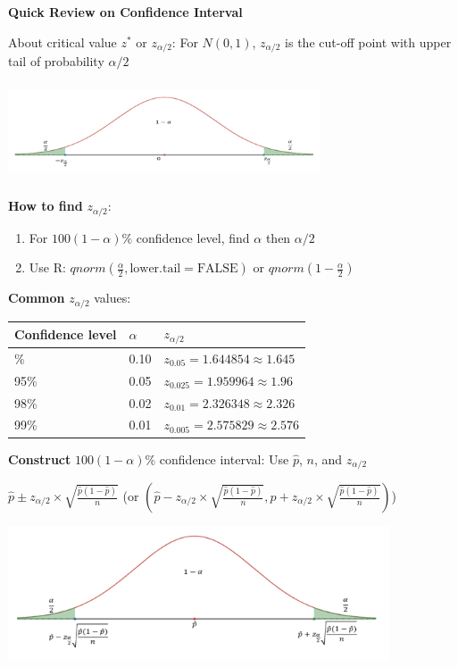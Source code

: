\documentclass[
]{book}
\begin{document}
\textbf{Quick Review on Confidence Interval}

About critical value \(z^*\) or \(z_{\alpha/2}\): For \(N(0,1)\), \(z_{\alpha/2}\) is the cut-off point with upper tail of probability \(\alpha/2\)

\includegraphics[width=3.64583in,height=1.14583in]{images/img48.png}

\textbf{How to find} \(z_{\alpha/2}\):

\begin{enumerate}
\def\labelenumi{(\arabic{enumi})}
\item
  For \(100(1-\alpha)\%\) confidence level, find \(\alpha\) then \(\alpha/2\)
\item
  Use R: \(qnorm\left(\frac{\alpha}{2}, \text{lower.tail} = \text{FALSE}\right)\) or \(qnorm\left(1 - \frac{\alpha}{2}\right)\)
\end{enumerate}

\textbf{Common} \(z_{\alpha/2}\) values:

\begin{longtable}[]{@{}lll@{}}
\toprule\noalign{}
Confidence level & \(\alpha\) & \(z_{\alpha/2}\) \\
\midrule\noalign{}
\endhead
\bottomrule\noalign{}
\endlastfoot
90\% & 0.10 & \(z_{0.05} = 1.644854 \approx 1.645\) \\
95\% & 0.05 & \(z_{0.025} = 1.959964 \approx 1.96\) \\
98\% & 0.02 & \(z_{0.01} = 2.326348 \approx 2.326\) \\
99\% & 0.01 & \(z_{0.005} = 2.575829 \approx 2.576\) \\
\end{longtable}

\textbf{Construct} \(100(1-\alpha)\%\) confidence interval: Use \(\hat{p}\), \(n\), and \(z_{\alpha/2}\)

\(\hat{p} \pm z_{\alpha/2} \times \sqrt{\frac{\hat{p}(1-\hat{p})}{n}}\) (or \((\hat{p} - z_{\alpha/2} \times \sqrt{\frac{\hat{p}(1-\hat{p})}{n}}, \hat{p} + z_{\alpha/2} \times \sqrt{\frac{\hat{p}(1-\hat{p})}{n}})\))

\includegraphics[width=4.44792in,height=\textheight]{images/img50.png}
\end{document}
